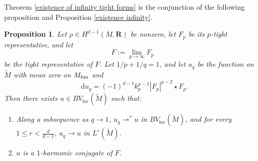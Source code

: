 \documentclass[reqno,11pt]{amsart}
\newcommand{\RR}{\mathbf{R}}
\newcommand*\dif{\mathop{}\!\mathrm{d}}
\newcommand{\weakto}{\rightharpoonup}
\newcommand{\loc}{\mathrm{loc}}
\newtheorem{proposition}[theorem]{Proposition}
\theoremstyle{definition}
\numberwithin{equation}{section}
\begin{document}
Theorem \ref{existence of infinity tight forms} is the conjunction of the following proposition and Proposition \ref{existence infinity}.

\begin{proposition}\label{existence 1}
Let $\rho \in H^{d - 1}(M, \RR)$ be nonzero, let $F_p$ be its $p$-tight representative, and let 
$$F := \lim_{p \to \infty} F_p$$
be the tight representative of $F$.
Let $1/p + 1/q = 1$, and let $u_q$ be the function on $\tilde M$ with mean zero on $M_{\rm fun}$ and
$$\dif u_q = (-1)^{d - 1} k_p^{p - 1} |F_p|^{p - 2} \star F_p.$$
Then there exists $u \in BV_\loc(\tilde M)$ such that:
\begin{enumerate}
\item Along a subsequence as $q \to 1$, $u_q \weakto^* u$ in $BV_\loc(\tilde M)$, and for every $1 \leq r < \frac{d}{d - 1}$, $u_q \to u$ in $L^r(\tilde M)$.
\item $u$ is a $1$-harmonic conjugate of $F$.
\end{enumerate}
\end{proposition}
\end{document}
